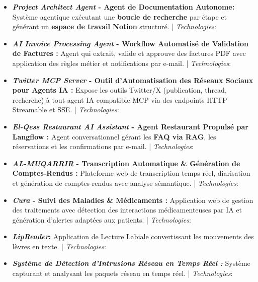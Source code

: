 \documentclass[10pt, letterpaper]{article}
\newenvironment{highlights}{
    \begin{itemize}[
        topsep=0.05cm,
        partopsep=0pt,
        itemsep=0.05cm,
        parsep=0pt,
        leftmargin=0.5cm
    ]
}{
    \end{itemize}
}
\begin{document}
\begin{highlights}

	\item \textbf{\textit{Project Architect Agent} - Agent de Documentation Autonome:} Système agentique exécutant une \textbf{boucle de recherche} par étape et générant un \textbf{espace de travail Notion} structuré. | \textit{Technologies}:    

	\item \textbf{\textit{AI Invoice Processing Agent} - Workflow Automatisé de Validation de Factures :} Agent qui extrait, valide et approuve des factures PDF avec application des règles métier et notifications par e-mail. | \textit{Technologies}:    

	\item \textbf{\textit{Twitter MCP Server} - Outil d'Automatisation des Réseaux Sociaux pour Agents IA :} Expose les outils Twitter/X (publication, thread, recherche) à tout agent IA compatible MCP via des endpoints HTTP Streamable et SSE. | \textit{Technologies}:   

	\item \textbf{\textit{El-Qess Restaurant AI Assistant} - Agent Restaurant Propulsé par Langflow :} Agent conversationnel gérant les \textbf{FAQ via RAG}, les réservations et les confirmations par e-mail. | \textit{Technologies}:     

	\item \textbf{\textit{AL-MUQARRIR} - Transcription Automatique \& Génération de Comptes-Rendus :} Plateforme web de transcription temps réel, diarisation et génération de comptes-rendus avec analyse sémantique. | \textit{Technologies}:     

	\item \textbf{\textit{Cura} - Suivi des Maladies \& Médicaments :} Application web de gestion des traitements avec détection des interactions médicamenteuses par IA et génération d'alertes adaptées aux patients. | \textit{Technologies}:      

	\item \textbf{\textit{LipReader}:} Application de Lecture Labiale convertissant les mouvements des lèvres en texte. | \textit{Technologies}:  

	\item \textbf{\textit{Système de Détection d'Intrusions Réseau en Temps Réel :}} Système capturant et analysant les paquets réseau en temps réel. | \textit{Technologies}:      

\end{highlights}
\end{document}
